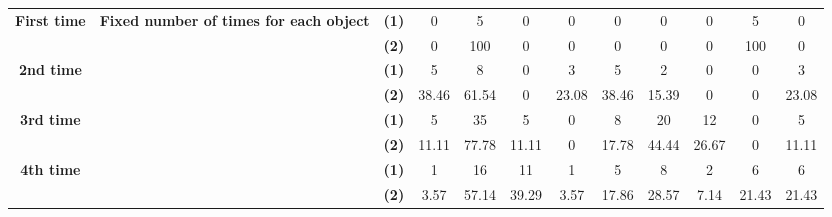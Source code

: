 \begin{table}
{\begin{tabular}{|c|c|c|c|c|c|c|c|c|c|c|c|}
         \multirow{2}{*}{\textbf{First time}}& \multirow{8}{*}{\parbox{1.5cm}{\textbf{Fixed number of times for each object}}} & \textbf{(1)} & 0 & 5 & 0 & 0 & 0 & 0 & 0 & 5 & 0\\ \cline{3-12}
         &  & \textbf{(2)} & 0 & 100 & 0 & 0 & 0 & 0 & 0 & 100 & 0\\ \cline{3-12} \cline{1-1}
         \multirow{2}{*}{\textbf{2nd time}}&  & \textbf{(1)} & 5 & 8 & 0 & 3 & 5 & 2 & 0 & 0 & 3\\ \cline{3-12}
         &  & \textbf{(2)} & 38.46 & 61.54 & 0 & 23.08 & 38.46 & 15.39 & 0 & 0 & 23.08\\ \cline{3-12} \cline{1-1}
         \multirow{2}{*}{\textbf{3rd time}}&  & \textbf{(1)} & 5 & 35 & 5 & 0 & 8 & 20 & 12 & 0 &5\\ \cline{3-12}
         &  & \textbf{(2)} & 11.11 & 77.78 & 11.11 & 0 & 17.78 & 44.44 & 26.67 & 0 &11.11\\ \cline{3-12} \cline{1-1}
         \multirow{2}{*}{\textbf{4th time}}&  & \textbf{(1)} & 1 & 16 & 11 & 1 & 5 & 8 & 2 & 6 &6\\ \cline{3-12}
         &  & \textbf{(2)} & 3.57 & 57.14 & 39.29 & 3.57 & 17.86 & 28.57 & 7.14 & 21.43 &21.43\\ \hline
         
   
    \end{tabular}}
    \label{tb7}
\end{table}

